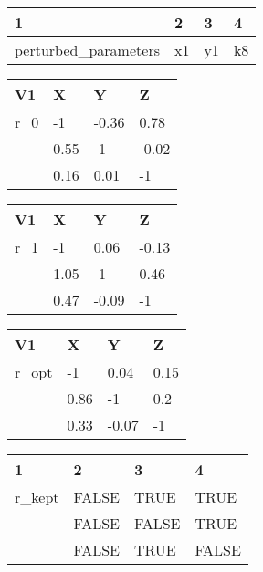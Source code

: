 \documentclass[10pt,a4paper]{article}
\begin{document}
\begin{table}[ht]
\centering
\begin{tabular}{llll}
  \hline
1 & 2 & 3 & 4 \\ 
  \hline
perturbed\_parameters & x1 & y1 & k8 \\ 
   \hline
\end{tabular}
\end{table}


\begin{table}[ht]
\centering
\begin{tabular}{llll}
  \hline
V1 & X & Y & Z \\ 
  \hline
r\_0 & -1 & -0.36 & 0.78 \\ 
   & 0.55 & -1 & -0.02 \\ 
   & 0.16 & 0.01 & -1 \\ 
   \hline
\end{tabular}
\end{table}


\begin{table}[ht]
\centering
\begin{tabular}{llll}
  \hline
V1 & X & Y & Z \\ 
  \hline
r\_1 & -1 & 0.06 & -0.13 \\ 
   & 1.05 & -1 & 0.46 \\ 
   & 0.47 & -0.09 & -1 \\ 
   \hline
\end{tabular}
\end{table}


\begin{table}[ht]
\centering
\begin{tabular}{llll}
  \hline
V1 & X & Y & Z \\ 
  \hline
r\_opt & -1 & 0.04 & 0.15 \\ 
   & 0.86 & -1 & 0.2 \\ 
   & 0.33 & -0.07 & -1 \\ 
   \hline
\end{tabular}
\end{table}


\begin{table}[ht]
\centering
\begin{tabular}{llll}
  \hline
1 & 2 & 3 & 4 \\ 
  \hline
r\_kept & FALSE & TRUE & TRUE \\ 
   & FALSE & FALSE & TRUE \\ 
   & FALSE & TRUE & FALSE \\ 
   \hline
\end{tabular}
\end{table}
 
\end{document}
